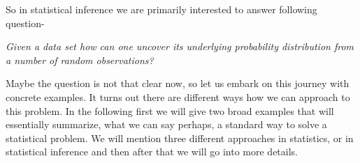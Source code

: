 \documentclass[ 11pt,%
				a4paper,%
				twoside,%
				headinclude,%
				footinclude = true,%
				cleardoublepage = empty,%
				reqno]{scrbook}
\begin{document}
So in statistical inference we are primarily interested to answer following question- 

\begin{longfbox}[
  border-style=none,
  margin-right=2em,
  margin-left=4em,
  border-left-style=solid,
  border-left-width=3pt,
  border-color=gray, 
  padding-left=1ex]

\textit{Given a data set how can one uncover its underlying probability distribution from a number of random observations?}
\end{longfbox}



Maybe the question is not that clear now, so let us embark on this journey with concrete examples. It turns out there are different ways how we can approach to this problem. In the following first we will give two broad examples that will essentially summarize, what we can say perhaps, a standard way to solve a statistical problem. We will mention three different approaches in statistics, or in statistical inference and then after that we will go into more details.
\end{document}
